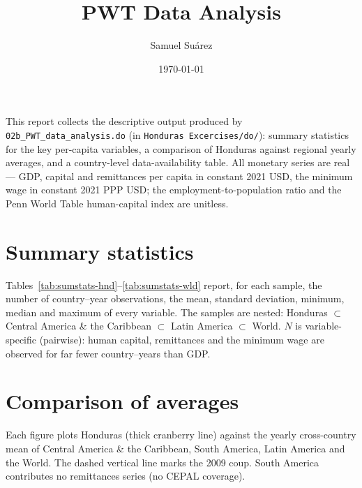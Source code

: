 \documentclass[11pt]{article}
\title{PWT Data Analysis}
\author{Samuel Su\'arez}
\date{\today}
\newcommand{\statstable}[3]{%
  \begin{table}[htbp]\centering
  \caption{#2}\label{#3}%
  \sbox{\statsbox}{}%
  \resizebox{\ifdim\wd\statsbox>\textwidth\textwidth\else\wd\statsbox\fi}{!}{\usebox{\statsbox}}%
  \end{table}}
\begin{document}
\maketitle
\tableofcontents
\bigskip

\noindent This report collects the descriptive output produced by
\texttt{02b\_PWT\_data\_analysis.do} (in \texttt{Honduras Excercises/do/}):
summary statistics for the key per-capita variables, a comparison of Honduras
against regional yearly averages, and a country-level data-availability table.
All monetary series are real --- GDP, capital and remittances per capita in
constant 2021 USD, the minimum wage in constant 2021 PPP USD; the
employment-to-population ratio and the Penn World Table human-capital index are
unitless.

\section{Summary statistics}

Tables~\ref{tab:sumstats-hnd}--\ref{tab:sumstats-wld} report, for each sample,
the number of country--year observations, the mean, standard deviation, minimum,
median and maximum of every variable. The samples are nested: Honduras
$\subset$ Central America \& the Caribbean $\subset$ Latin America $\subset$
World. $N$ is variable-specific (pairwise): human capital, remittances and the
minimum wage are observed for far fewer country--years than GDP.

\statstable{../output/tables/summary_stats_hnd.tex}{Summary statistics --- Honduras}{tab:sumstats-hnd}
\statstable{../output/tables/summary_stats_cac.tex}{Summary statistics --- Central America \& the Caribbean}{tab:sumstats-cac}
\statstable{../output/tables/summary_stats_lac.tex}{Summary statistics --- Latin America}{tab:sumstats-lac}
\statstable{../output/tables/summary_stats_wld.tex}{Summary statistics --- World (full PWT panel)}{tab:sumstats-wld}

\FloatBarrier
\section{Comparison of averages}

Each figure plots Honduras (thick cranberry line) against the yearly
cross-country mean of Central America \& the Caribbean, South America, Latin
America and the World. The dashed vertical line marks the 2009 coup. South
America contributes no remittances series (no CEPAL coverage).
\end{document}
